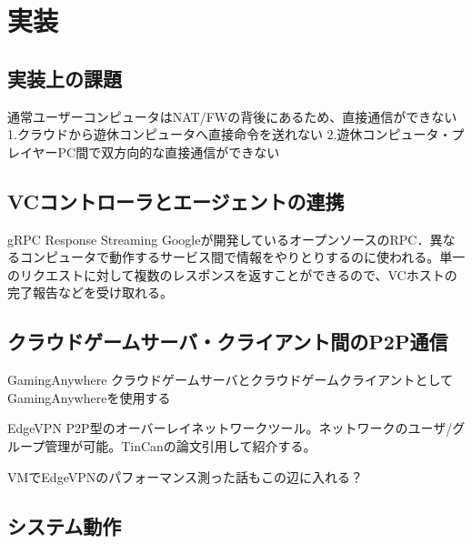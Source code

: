 \section{実装}

\subsection{実装上の課題}
通常ユーザーコンピュータはNAT/FWの背後にあるため、直接通信ができない
1.クラウドから遊休コンピュータへ直接命令を送れない
2.遊休コンピュータ・プレイヤーPC間で双方向的な直接通信ができない


\subsection{VCコントローラとエージェントの連携}
gRPC Response Streaming
Googleが開発しているオープンソースのRPC．異なるコンピュータで動作するサービス間で情報をやりとりするのに使われる。単一のリクエストに対して複数のレスポンスを返すことができるので、VCホストの完了報告などを受け取れる。

\subsection{クラウドゲームサーバ・クライアント間のP2P通信}

GamingAnywhere
クラウドゲームサーバとクラウドゲームクライアントとしてGamingAnywhereを使用する

EdgeVPN
P2P型のオーバーレイネットワークツール。ネットワークのユーザ/グループ管理が可能。TinCanの論文引用して紹介する。

VMでEdgeVPNのパフォーマンス測った話もこの辺に入れる？

\subsection{システム動作}

